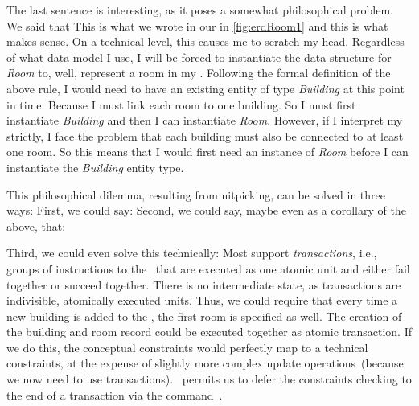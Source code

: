 The last sentence is interesting, as it poses a somewhat philosophical problem.
We said that 
This is what we wrote in our  in \cref{fig:erdRoom1} and this is what makes sense.
On a technical level, this causes me to scratch my head.
Regardless of what data model I use, I will be forced to instantiate the data structure for \emph{Room} to, well, represent a room in my \db.
Following the formal definition of the above rule, I would need to have an existing entity of type \emph{Building} at this point in time.
Because I must link each room to one building.
So I must first instantiate \emph{Building} and then I can instantiate \emph{Room}.
However, if I interpret my  strictly, I face the problem that each building must also be connected to at least one room.
So this means that I would first need an instance of \emph{Room} before I can instantiate the \emph{Building} entity type.

This philosophical dilemma, resulting from nitpicking, can be solved in three ways:
First, we could say:
\emph{}
Second, we could say, maybe even as a corollary of the above, that:
\emph{}

Third, we could even solve this technically:
Most  support \emph{transactions}, i.e., groups of instructions to the \db\ that are executed as one atomic unit and either fail together or succeed together.
There is no intermediate state, as transactions are indivisible, atomically executed units.
Thus, we could require that every time a new building is added to the \db, the first room is specified as well.
The creation of the building and room record could be executed together as atomic transaction.
If we do this, the conceptual constraints would perfectly map to a technical constraints, at the expense of slightly more complex update operations~(because we now need to use transactions).
\postgresql\ permits us to defer the constraints checking to the end of a transaction via the  command~\cite{PGDG:PD:SC:SC,N2016SSFA:DC}.

